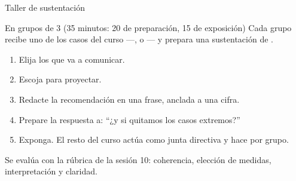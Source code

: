 \documentclass[aspectratio=169,10pt]{beamer}
\begin{document}
\begin{frame}{Taller de sustentación}
  \begin{alertblock}{En grupos de 3 (35 minutos: 20 de preparación, 15 de
                     exposición)}
    \scriptsize
    Cada grupo recibe uno de los casos del curso —,
     o — y prepara una
    sustentación de .

    \vspace{0.2cm}
    \begin{enumerate}\setlength{\itemsep}{-0.06cm}
      \item Elija los  que va a comunicar.
      \item Escoja  para proyectar.
      \item Redacte la recomendación en una frase, anclada a una cifra.
      \item Prepare la respuesta a: ``¿y si quitamos los casos extremos?''
      \item Exponga. El resto del curso actúa como junta directiva y hace
             por grupo.
    \end{enumerate}

    \vspace{0.12cm}
    Se evalúa con la rúbrica de la sesión 10: coherencia, elección de medidas,
    interpretación y claridad.
  \end{alertblock}
\end{frame}

\end{document}
